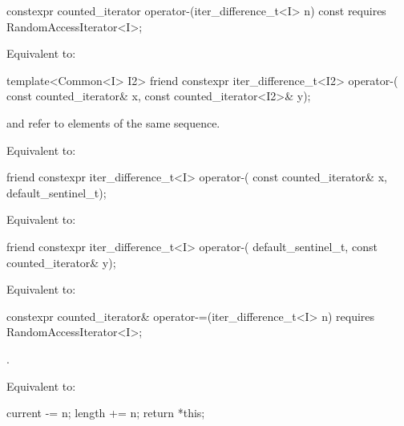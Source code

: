 %
\begin{itemdecl}
  constexpr counted_iterator operator-(iter_difference_t<I> n) const
    requires RandomAccessIterator<I>;
\end{itemdecl}

\begin{itemdescr}
\pnum
\effects Equivalent to: 
\end{itemdescr}

%
\begin{itemdecl}
template<Common<I> I2>
  friend constexpr iter_difference_t<I2> operator-(
    const counted_iterator& x, const counted_iterator<I2>& y);
\end{itemdecl}

\begin{itemdescr}
\pnum
\expects
{} and  refer to elements of the same
sequence.

\pnum
\effects Equivalent to: 
\end{itemdescr}

%
\begin{itemdecl}
friend constexpr iter_difference_t<I> operator-(
  const counted_iterator& x, default_sentinel_t);
\end{itemdecl}

\begin{itemdescr}
\pnum
\effects Equivalent to:
\end{itemdescr}

%
\begin{itemdecl}
friend constexpr iter_difference_t<I> operator-(
  default_sentinel_t, const counted_iterator& y);
\end{itemdecl}

\begin{itemdescr}
\pnum
\effects Equivalent to: 
\end{itemdescr}

%
\begin{itemdecl}
constexpr counted_iterator& operator-=(iter_difference_t<I> n)
  requires RandomAccessIterator<I>;
\end{itemdecl}

\begin{itemdescr}
\pnum
\expects {}.

\pnum
\effects Equivalent to:
\begin{codeblock}
current -= n;
length += n;
return *this;
\end{codeblock}
\end{itemdescr}

